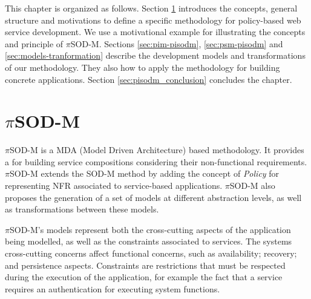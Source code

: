 This chapter is organized as follows. Section
\ref{sec:pisodm} introduces the concepts, general structure and motivations
to define a specific methodology for policy-based web service development.
We use a motivational example for
illustrating the concepts and principle of $\pi$SOD-M. Sections
\ref{sec:pim-pisodm}, \ref{sec:psm-pisodm} and \ref{sec:models-tranformation} describe the development
models and transformations of our methodology. They also how to apply the
methodology for building concrete applications. Section \ref{sec:pisodm_conclusion} concludes the chapter.

\section{$\pi$SOD-M}  
\label{sec:pisodm}

$\pi$SOD-M is a MDA (Model Driven Architecture) based methodology. It provides
a  for building service compositions considering
their non-functional requirements. $\pi$SOD-M extends the SOD-M \cite{valeriaThesis} method by adding
the concept of \textit{Policy} \cite{Espinosa-OviedoVZC09,Espinosa-Oviedo2011a}
for representing NFR associated to service-based applications. $\pi$SOD-M also
proposes the generation of a set of models at different abstraction levels, as
well as transformations between these models.




$\pi$SOD-M's models represent both the cross-cutting aspects of the application
being modelled, as well as the constraints associated to services. The systems
cross-cutting concerns affect functional concerns, such as availability;
recovery; and persistence aspects. Constraints are restrictions that must be
respected during the execution of the application, for example the fact that a
service requires an authentication for executing system functions. 

